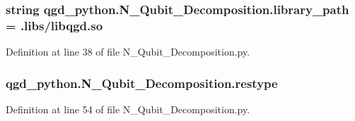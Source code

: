 \subsubsection[{\texorpdfstring{library\+\_\+path}{library_path}}]{\setlength{\rightskip}{0pt plus 5cm}string qgd\+\_\+python.\+N\+\_\+\+Qubit\+\_\+\+Decomposition.\+library\+\_\+path = \textquotesingle{}.libs/libqgd.\+so\textquotesingle{}}\hypertarget{group__python_ga36e466ce872adb198d01ce19abdd3177}{}\label{group__python_ga36e466ce872adb198d01ce19abdd3177}


Definition at line 38 of file N\+\_\+\+Qubit\+\_\+\+Decomposition.\+py.

\subsubsection[{\texorpdfstring{restype}{restype}}]{\setlength{\rightskip}{0pt plus 5cm}qgd\+\_\+python.\+N\+\_\+\+Qubit\+\_\+\+Decomposition.\+restype}\hypertarget{group__python_ga9341b826d33e46599c99a2da15e9c2be}{}\label{group__python_ga9341b826d33e46599c99a2da15e9c2be}


Definition at line 54 of file N\+\_\+\+Qubit\+\_\+\+Decomposition.\+py.

